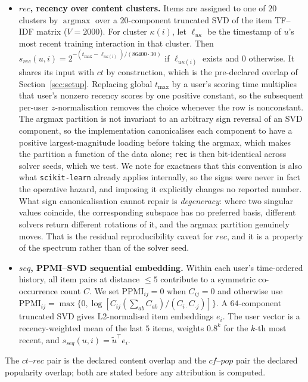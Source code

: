 \documentclass[pdflatex,sn-basic,Numbered]{sn-jnl}
\theoremstyle{plain}
\theoremstyle{definition}
\begin{document}
\begin{itemize}
\item \textbf{$rec$, recency over content clusters.} Items are assigned to one
      of $20$ clusters by $\operatorname{argmax}$ over a $20$-component
      truncated SVD of the item TF--IDF matrix ($V = 2000$). For cluster
      $\kappa(i)$, let $\ell_{u\kappa}$ be the timestamp of $u$'s most recent
      training interaction in that cluster. Then
      $s_{rec}(u,i) = 2^{-(t_{\max}-\ell_{u\kappa(i)})/(86400 \cdot 30)}$ if
      $\ell_{u\kappa(i)}$ exists and $0$ otherwise. It shares its input with
      $ct$ by construction, which is the pre-declared overlap of
      Section~\ref{sec:setup}. Replacing global $t_{\max}$ by a user's scoring
      time multiplies that user's nonzero recency scores by one positive
      constant, so the subsequent per-user $z$-normalisation removes the choice
      whenever the row is nonconstant. The argmax partition is not invariant
      to an arbitrary sign reversal of an SVD component, so the implementation
      canonicalises each component to have a positive largest-magnitude
      loading before taking the argmax, which makes the partition a function
      of the data alone; \texttt{rec} is then bit-identical across solver
      seeds, which we test. We note for exactness that this convention is also
      what \texttt{scikit-learn} already applies internally, so the signs were
      never in fact the operative hazard, and imposing it explicitly changes
      no reported number. What sign canonicalisation cannot repair is
      \emph{degeneracy}: where two singular values coincide, the corresponding
      subspace has no preferred basis, different solvers return different
      rotations of it, and the argmax partition genuinely moves. That is the
      residual reproducibility caveat for $rec$, and it is a property of the
      spectrum rather than of the solver seed.

\item \textbf{$seq$, PPMI--SVD sequential embedding.} Within each user's
      time-ordered history, all item pairs at distance $\le 5$ contribute to a
      symmetric co-occurrence count $C$. We set
      $\mathrm{PPMI}_{ij}=0$ when $C_{ij}=0$ and otherwise use
      $\mathrm{PPMI}_{ij}=\max\bigl\{0,
      \log[C_{ij}(\sum_{ab}C_{ab})/(C_{i\cdot}C_{\cdot j})]\bigr\}$. A
      $64$-component truncated SVD gives L2-normalised item embeddings $e_i$.
      The user vector is a recency-weighted mean of the last $5$ items,
      weights $0.8^{k}$ for the $k$-th most recent, and
      $s_{seq}(u,i) = \tilde{u}^\top e_i$.
\end{itemize}
%
The $ct$--$rec$ pair is the declared content overlap and the $cf$--$pop$ pair
the declared popularity overlap; both are stated before any attribution is
computed.
\end{document}
